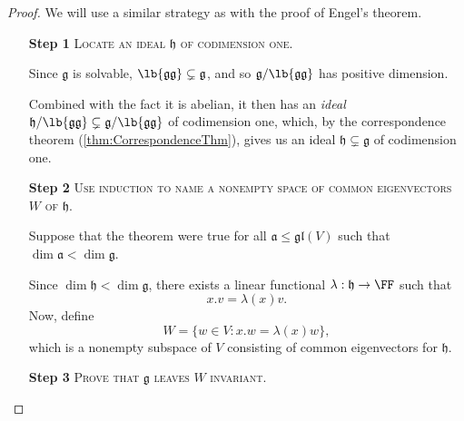 \documentclass{article}
\DeclarePairedDelimiter\lb\lbrack\rbrack
\newcommand*\frka{{\ensuremath{\mathfrak{a}}}}
\newcommand*\frkg{{\ensuremath{\mathfrak{g}}}}
\newcommand*\frkh{{\ensuremath{\mathfrak{h}}}}
\newcommand*\gl{\ensuremath{\mathfrak{gl}}}
\newcommand*\acts{.}
\begin{document}
\begin{proof} 
    We will use a similar strategy as with the proof of Engel's theorem.
    \begin{itemize}
        \item[\textbf{Step 1}] 
            \textsc{\color{Crimson} Locate an ideal $\frkh$ of codimension one.}

            Since $\frkg$ is solvable, $\lb{\frkg\frkg} \subsetneq \frkg$, and so $\frkg/\lb{\frkg\frkg}$ has positive dimension.

            Combined with the fact it is abelian, it then has an \textit{ideal} $\frkh/\lb{\frkg\frkg} \subsetneq \frkg/\lb{\frkg\frkg}$ of codimension one, which, by the correspondence theorem (\ref{thm:CorrespondenceThm}), gives us an ideal $\frkh \subsetneq \frkg$ of codimension one.
        \item[\textbf{Step 2}]
            \textsc{\color{Crimson} Use induction to name a nonempty space of common eigenvectors $W$ of $\frkh$.}

            Suppose that the theorem were true for all $\frka \leq \gl(V)$ such that $\dim \frka < \dim \frkg$.

            Since $\dim \frkh < \dim \frkg$, there exists a linear functional $\lambda: \frkh \to \FF$ such that
            \[
                x \acts v 
                =
                \lambda(x)v.
            \]
            Now, define
            \[
                W
                =
                \Big\{
                    w \in V:
                    x \acts w
                    =
                    \lambda(x)w
                \Big\},
            \]
            which is a nonempty subspace of $V$ consisting of common eigenvectors for $\frkh$.
        \item[\textbf{Step 3}]
            \textsc{\color{Crimson} Prove that $\frkg$ leaves $W$ invariant.}


\end{itemize}
\end{proof}
\end{document}
